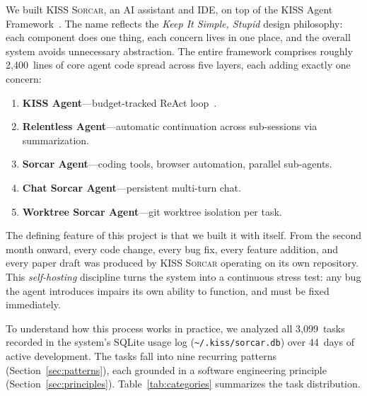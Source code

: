 \documentclass{article}
\newcommand{\kisssys}{\textsc{KISS Sorcar}}
\begin{document}
We built \kisssys{}, an AI assistant and IDE, on top of the KISS Agent
Framework~\cite{sen2026kiss}.
The name reflects the \emph{Keep It Simple, Stupid} design philosophy:
each component does one thing, each concern lives in one place,
and the overall system avoids unnecessary abstraction.
The entire framework comprises roughly 2,400~lines of core agent code
spread across five layers, each adding exactly one concern:

\begin{enumerate}[nosep]
  \item \textbf{KISS Agent}---budget-tracked ReAct loop~\cite{yao2023react}.
  \item \textbf{Relentless Agent}---automatic continuation across
        sub-sessions via summarization.
  \item \textbf{Sorcar Agent}---coding tools, browser automation,
        parallel sub-agents.
  \item \textbf{Chat Sorcar Agent}---persistent multi-turn chat.
  \item \textbf{Worktree Sorcar Agent}---git worktree isolation per task.
\end{enumerate}

The defining feature of this project is that we built it with itself.
From the second month onward, every code change, every bug fix, every
feature addition, and every paper draft was produced by \kisssys{}
operating on its own repository.
This \emph{self-hosting} discipline turns the system into a continuous
stress test: any bug the agent introduces impairs its own ability to
function, and must be fixed immediately.

To understand how this process works in practice, we analyzed all
3,099~tasks recorded in the system's SQLite usage log
(\texttt{\textasciitilde/.kiss/sorcar.db}) over 44~days of active development.
The tasks fall into nine recurring patterns
(Section~\ref{sec:patterns}), each grounded in a software engineering
principle (Section~\ref{sec:principles}).
Table~\ref{tab:categories} summarizes the task distribution.
\end{document}
